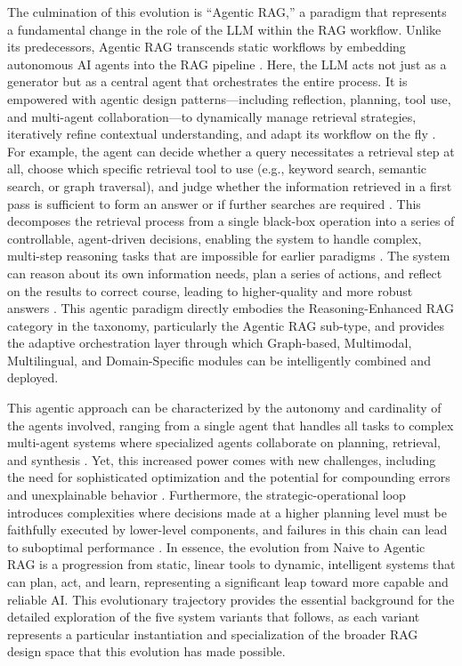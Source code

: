 \documentclass[11pt]{article}
\begin{document}
The culmination of this evolution is ``Agentic RAG,'' a paradigm that represents a fundamental change in the role of the LLM within the RAG workflow. Unlike its predecessors, Agentic RAG transcends static workflows by embedding autonomous AI agents into the RAG pipeline \cite{ref22,ref25}. Here, the LLM acts not just as a generator but as a central agent that orchestrates the entire process. It is empowered with agentic design patterns---including reflection, planning, tool use, and multi-agent collaboration---to dynamically manage retrieval strategies, iteratively refine contextual understanding, and adapt its workflow on the fly \cite{ref22,ref26}. For example, the agent can decide whether a query necessitates a retrieval step at all, choose which specific retrieval tool to use (e.g., keyword search, semantic search, or graph traversal), and judge whether the information retrieved in a first pass is sufficient to form an answer or if further searches are required \cite{ref27,ref28}. This decomposes the retrieval process from a single black-box operation into a series of controllable, agent-driven decisions, enabling the system to handle complex, multi-step reasoning tasks that are impossible for earlier paradigms \cite{ref29}. The system can reason about its own information needs, plan a series of actions, and reflect on the results to correct course, leading to higher-quality and more robust answers \cite{ref26,ref21}. This agentic paradigm directly embodies the Reasoning-Enhanced RAG category in the taxonomy, particularly the Agentic RAG sub-type, and provides the adaptive orchestration layer through which Graph-based, Multimodal, Multilingual, and Domain-Specific modules can be intelligently combined and deployed.

This agentic approach can be characterized by the autonomy and cardinality of the agents involved, ranging from a single agent that handles all tasks to complex multi-agent systems where specialized agents collaborate on planning, retrieval, and synthesis \cite{ref22}. Yet, this increased power comes with new challenges, including the need for sophisticated optimization and the potential for compounding errors and unexplainable behavior \cite{ref25,ref30,ref31}. Furthermore, the strategic-operational loop introduces complexities where decisions made at a higher planning level must be faithfully executed by lower-level components, and failures in this chain can lead to suboptimal performance \cite{ref30}. In essence, the evolution from Naive to Agentic RAG is a progression from static, linear tools to dynamic, intelligent systems that can plan, act, and learn, representing a significant leap toward more capable and reliable AI. This evolutionary trajectory provides the essential background for the detailed exploration of the five system variants that follows, as each variant represents a particular instantiation and specialization of the broader RAG design space that this evolution has made possible.
\end{document}
